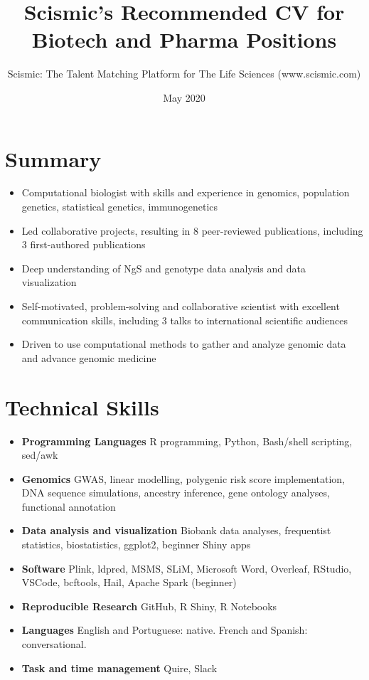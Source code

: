 \documentclass{article}
\title{Scismic's Recommended CV for Biotech and Pharma Positions}
\author{Scismic: The Talent Matching Platform for The Life Sciences (www.scismic.com)}
\date{May 2020}
\begin{document}
\makecvtitle %
\section{Summary}
\begin{itemize}
\item Computational biologist with skills and experience in genomics, population genetics, statistical genetics, immunogenetics
\item Led collaborative projects, resulting in 8 peer-reviewed publications, including 3 first-authored publications
\item Deep understanding of NgS and genotype data analysis and data visualization 
\item Self-motivated, problem-solving and collaborative scientist with excellent communication skills, including 3 talks to international scientific audiences
\item Driven to use computational methods to gather and analyze genomic data and advance genomic medicine
\end{itemize}
 
\section{Technical Skills}


\begin{itemize}
\item \textbf{Programming Languages} R programming, Python, Bash/shell scripting, sed/awk
\item \textbf{Genomics} GWAS, linear modelling, polygenic risk score implementation, DNA sequence simulations, ancestry inference, gene ontology analyses, functional annotation
\item \textbf{Data analysis and visualization} Biobank data analyses, frequentist statistics, biostatistics, ggplot2, beginner Shiny apps
\item \textbf{Software} Plink, ldpred, MSMS, SLiM, Microsoft Word, Overleaf, RStudio, VSCode, bcftools, Hail, Apache Spark (beginner)
\item \textbf{Reproducible Research} GitHub, R Shiny, R Notebooks
\item \textbf{Languages}	English and Portuguese: native. French and Spanish: conversational.
\item \textbf{Task and time management} Quire, Slack
\end{itemize}
 
\end{document}
